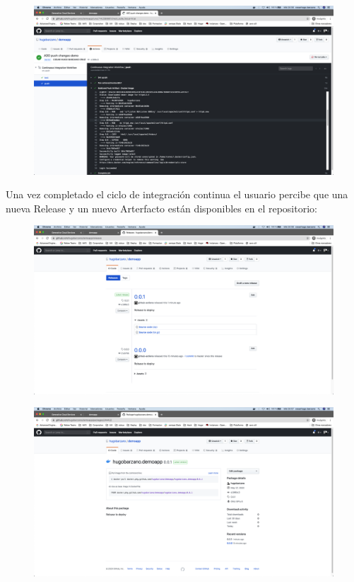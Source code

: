 \documentclass[a4paper,11pt]{book}
\begin{document}
  \begin{figure}[H]
\centering
\includegraphics[scale=0.2]{imagenes/casouso/2_7.png}
\caption{   }
\end{figure}

 Una vez completado el ciclo de integración continua el usuario percibe que una nueva Release y un nuevo Arterfacto están disponibles en el repositorio:
 
   \begin{figure}[H]
\centering
\includegraphics[scale=0.2]{imagenes/casouso/2_8.png}
\caption{   }
\end{figure}

  \begin{figure}[H]
\centering
\includegraphics[scale=0.2]{imagenes/casouso/2_9.png}
\caption{   }
\end{figure}
 
\end{document}
